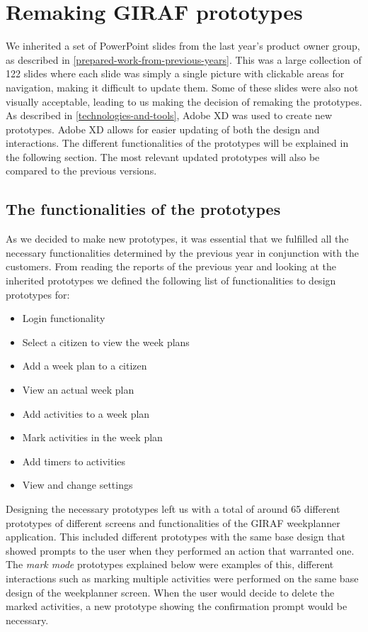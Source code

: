 \section{Remaking GIRAF prototypes}\label{prototype-comp}
We inherited a set of PowerPoint slides from the last year's product owner group, as described in \autoref{prepared-work-from-previous-years}.
This was a large collection of 122 slides where each slide was simply a single picture with clickable areas for navigation, making it difficult to update them.
Some of these slides were also not visually acceptable, leading to us making the decision of remaking the prototypes.
As described in \autoref{technologies-and-tools}, Adobe XD was used to create new prototypes.
Adobe XD allows for easier updating of both the design and interactions.
The different functionalities of the prototypes will be explained in the following section.
The most relevant updated prototypes will also be compared to the previous versions.

\subsection{The functionalities of the prototypes}
As we decided to make new prototypes, it was essential that we fulfilled all the necessary functionalities determined by the previous year in conjunction with the customers.
From reading the reports of the previous year and looking at the inherited prototypes we defined the following list of functionalities to design prototypes for:
\begin{itemize}
    \item Login functionality
    \item Select a citizen to view the week plans
    \item Add a week plan to a citizen
    \item View an actual week plan
    \item Add activities to a week plan
    \item Mark activities in the week plan
    \item Add timers to activities
    \item View and change settings
\end{itemize}
Designing the necessary prototypes left us with a total of around 65 different prototypes of different screens and functionalities of the GIRAF weekplanner application.
This included different prototypes with the same base design that showed prompts to the user when they performed an action that warranted one.
The \textit{mark mode} prototypes explained below were examples of this, different interactions such as marking multiple activities were performed on the same base design of the weekplanner screen.
When the user would decide to delete the marked activities, a new prototype showing the confirmation prompt would be necessary.


